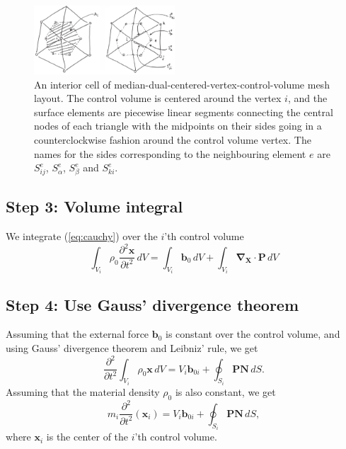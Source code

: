 \documentclass[acmtog]{acmart}
\begin{document}
\begin{figure}
  \centering
  \includegraphics[width=0.47\textwidth]{Images/cv2.png}
  \caption{An interior cell of median-dual-centered-vertex-control-volume mesh layout. The control volume is centered around the vertex $i$, and the surface elements are piecewise linear segments connecting the central nodes of each triangle with the midpoints on their sides going in a counterclockwise fashion around the control volume vertex. The names for the sides corresponding to the neighbouring element $e$ are $S^e_{ij}$, $S^e_{\alpha}$, $S^e_{\beta}$ and $S^e_{ki}$.\label{fig:mesh1}}
\end{figure}

\subsection*{Step 3: Volume integral}
We integrate (\ref{eq:cauchy}) over the $i$'th control volume
%
\begin{equation}
  \int_{V_i} \rho_0 \frac{ \partial^{2} \boldsymbol x }{ \partial t^{2} }  \, d V = \int_{V_i} \boldsymbol b_0 \, d V + \int_{V_i} \boldsymbol \nabla_{\boldsymbol X} \cdot \boldsymbol P \, d V
\end{equation}


\subsection*{Step 4: Use Gauss' divergence theorem}
Assuming that the external force $\boldsymbol b_0$ is constant over the control volume, and using Gauss' divergence theorem and Leibniz' rule, we get
%
\begin{equation}
  \frac{ \partial^{2} }{ \partial t^{2} } \int_{V_i} \rho_0 \boldsymbol x \, d V = V_i\boldsymbol b_{0i} + \oint_{S_i} \boldsymbol P \boldsymbol N \, dS.
\end{equation}
%
Assuming that the material density $\rho_0$ is also constant, we get
%
\begin{equation}
  m_i \frac{ \partial^{2} }{ \partial t^{2} } \left(\boldsymbol x_i \right)  = V_i \boldsymbol b_{0i} + \oint_{S_i} \boldsymbol P \boldsymbol N \, dS,
\end{equation}
%
where $\boldsymbol x_i$ is the center of the $i$'th control volume.
\end{document}
